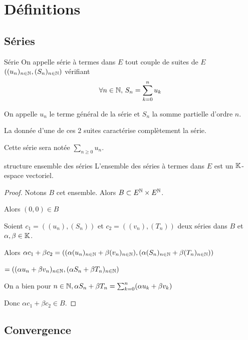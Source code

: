 
\section{Définitions }
\subsection{Séries}

\begin{definition}{Série}{}
    On appelle série à termes dans $E$ tout couple de suites de $E$ $\left( (u_n)_{n\in\mathbb{N}}, (S_n)_{n\in\mathbb{N}} \right)$ vérifiant 
    $$\forall n \in \mathbb{N}, \, S_n = \sum_{k=0}^n u_k$$

    On appelle $u_n$ le terme général de la série et $S_n$ la somme partielle d'ordre $n$.

    La donnée d'une de ces 2 suites caractérise complètement la série. 

    Cette série sera notée $\sum_{n \geqslant 0} u_n$.
\end{definition}

\begin{proposition}{structure ensemble des séries}{}
    L'ensemble des séries à termes dans $E$ est un $\mathbb{K}$-espace vectoriel.
\end{proposition}

\begin{proof}
    Notons $B$ cet ensemble. Alors $B \subset E^{\mathbb{N}} \times E^{\mathbb{N}}$.

    Alors $(0, 0) \in B$

    Soient $c_1 = \left( (u_n), (S_n) \right)$ et $c_2 = \left( (v_n), (T_n) \right)$ 
    deux séries dans $B$ et $\alpha, \beta \in \mathbb{K}$. 

    Alors $\alpha c_1 + \beta c_2 = \left( (\alpha(u_n)_{n \in \mathbb{N}} + \beta(v_n)_{n \in \mathbb{N}}), (\alpha(S_n)_{n \in \mathbb{N}} + \beta(T_n)_{n \in \mathbb{N}}) \right)$

    $ = \left( (\alpha u_n + \beta v_n)_{n \in \mathbb{N}}, (\alpha S_n + \beta T_n)_{n \in \mathbb{N}} \right)$

    On a bien pour $n \in \mathbb{N}, \alpha S_n + \beta T_n = \sum_{k=0}^n (\alpha u_k + \beta v_k)$

    Donc $\alpha c_1 + \beta c_2 \in B$.

\end{proof}

\subsection{Convergence }

